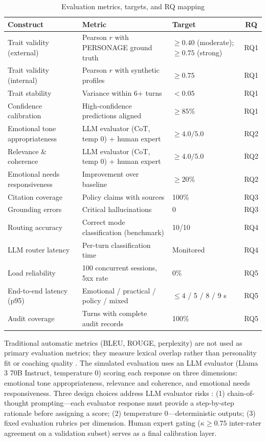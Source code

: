 \documentclass[10pt,a4paper]{report}
\begin{document}
\begin{table}[H]
\centering\footnotesize
\caption{Evaluation metrics, targets, and RQ mapping}
\begin{tabularx}{\textwidth}{@{}lXXc@{}}
\toprule
Construct & Metric & Target & RQ \\
\midrule
Trait validity (external) & Pearson $r$ with PERSONAGE ground truth & $\geq 0.40$ (moderate); $\geq 0.75$ (strong) & RQ1 \\
Trait validity (internal) & Pearson $r$ with synthetic profiles & $\geq 0.75$ & RQ1 \\
Trait stability & Variance within 6+ turns & $< 0.05$ & RQ1 \\
Confidence calibration & High-confidence predictions aligned & $\geq 85\%$ & RQ1 \\
Emotional tone appropriateness & LLM evaluator (CoT, temp 0) + human expert & $\geq 4.0/5.0$ & RQ2 \\
Relevance \& coherence & LLM evaluator (CoT, temp 0) + human expert & $\geq 4.0/5.0$ & RQ2 \\
Emotional needs responsiveness & Improvement over baseline & $\geq 20\%$ & RQ2 \\
Citation coverage & Policy claims with sources & 100\% & RQ3 \\
Grounding errors & Critical hallucinations & 0 & RQ3 \\
Routing accuracy & Correct mode classification (benchmark) & 10/10 & RQ4 \\
LLM router latency & Per-turn classification time & Monitored & RQ4 \\
Load reliability & 100 concurrent sessions, 5xx rate & 0\% & RQ5 \\
End-to-end latency (p95) & Emotional / practical / policy / mixed & $\leq 4$ / 5 / 8 / 9 s & RQ5 \\
Audit coverage & Turns with complete audit records & 100\% & RQ5 \\
\bottomrule
\end{tabularx}
\end{table}

Traditional automatic metrics (BLEU, ROUGE, perplexity) are not used as primary evaluation metrics; they measure lexical overlap rather than personality fit or coaching quality \citep{Yeh2021}. The simulated evaluation uses an LLM evaluator (Llama 3 70B Instruct, temperature 0) scoring each response on three dimensions: emotional tone appropriateness, relevance and coherence, and emotional needs responsiveness. Three design choices address LLM evaluator risks \citep{Guo2023}: (1) chain-of-thought prompting---each evaluator response must provide a step-by-step rationale before assigning a score; (2) temperature 0---deterministic outputs; (3) fixed evaluation rubrics per dimension. Human expert gating ($\kappa \geq 0.75$ inter-rater agreement on a validation subset) serves as a final calibration layer.
\end{document}
